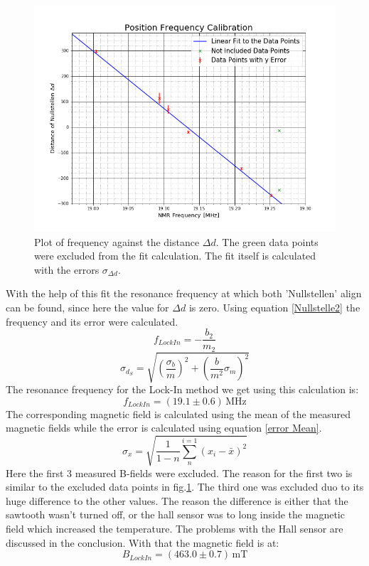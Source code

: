 \begin{figure}[h]
	\includegraphics[scale=0.5]{Bild/Eichung.png}
	\centering
	\caption[Distance of 'Nullstellen' to Frequency Plot]{Plot of frequency against the distance $\Delta d$. The green data points were excluded from the fit calculation. The fit itself is calculated with the errors $\sigma_{\Delta d}$.}
	\label{Nullstellenfit}
\end{figure}
With the help of this fit the resonance frequency at which both 'Nullstellen' align can be found, since here the value for $\Delta d$ is zero. Using equation \ref{Nullstelle2} the frequency and its error were calculated.
\begin{equation}
f_{LockIn}=-\frac{b_2}{m_2}
\label{Nullstelle2}
\end{equation}
\begin{equation}
\sigma_{d_S}=\sqrt{(\frac{\sigma_{b}}{m})^2+(\frac{b}{m^2}\sigma_{m})^2}
\end{equation}
The resonance frequency for the Lock-In method we get using this calculation is:$$f_{LockIn}=(19.1\pm0.6)\,\text{MHz}$$
The corresponding magnetic field is calculated using the mean of the measured magnetic fields while the error is calculated using equation \ref{error Mean}.
\begin{equation}
	\sigma_x=\sqrt{\frac{1}{1-n}\sum_{n}^{i=1}(x_i-\bar{x})^2}
	\label{error Mean}
\end{equation}
Here the first 3 measured B-fields were excluded. The reason for the first two is similar to the excluded data points in fig.\ref{Nullstellenfit}. The third one was excluded duo to its huge difference to the other values. The reason the difference is either that the sawtooth wasn't turned off, or the hall sensor was to long inside the magnetic field which increased the temperature. The problems with the Hall sensor are discussed in the conclusion. With that the magnetic field is at:
$$B_{LockIn} = (463.0\pm0.7)\,\text{mT}$$
